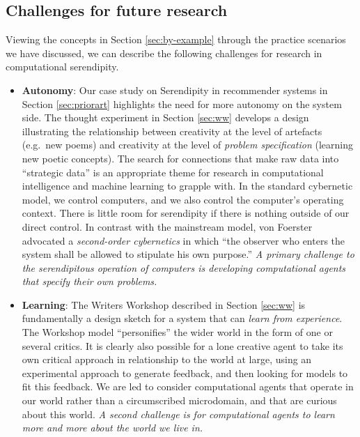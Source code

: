 \subsection{Challenges for future research} \label{sec:recommendations}

Viewing the concepts in Section \ref{sec:by-example} through the
practice scenarios we have discussed, we can describe the following
challenges for research in computational serendipity.

\begin{itemize}
\item \textbf{Autonomy}: Our case study on Serendipity in recommender systems in Section \ref{sec:priorart} highlights the need for more autonomy on the system side. The thought experiment in Section
  \ref{sec:ww} develops a design illustrating the relationship between
  creativity at the level of artefacts (e.g.~new poems) and creativity
  at the level of \emph{problem specification} (learning new poetic
  concepts).  The search for connections that make raw data into
  ``strategic data'' is an appropriate theme for research in
  computational intelligence and machine learning to grapple with.  In
  the standard cybernetic model, we control computers, and we also
  control the computer's operating context.  There is little room for
  serendipity if there is nothing outside of our direct control.  In
  contrast with the mainstream model, von Foerster
  \citeyear[p. 286]{von2003cybernetics} advocated a \emph{second-order
    cybernetics} in which ``the observer who enters the system shall
  be allowed to stipulate his own purpose.''  \emph{A primary
    challenge to the serendipitous operation of computers is
    developing computational agents that specify their own problems.}
\end{itemize}

\begin{itemize}
\item \textbf{Learning}: The Writers Workshop described in Section
  \ref{sec:ww} is fundamentally a design sketch for a system
  that can \emph{learn from experience}.  The Workshop model
  ``personifies'' the wider world in the form of one or several
  critics.  It is clearly also possible for a lone creative agent to
  take its own critical approach in relationship to the world at
  large, using an experimental approach to generate feedback, and then
  looking for models to fit this feedback.   We are led to consider 
  computational agents that operate in our world rather
  than a circumscribed microdomain, and that are curious about this
  world.  \emph{A second challenge is for computational agents to
    learn more and more about the world we live in.}
\end{itemize}

